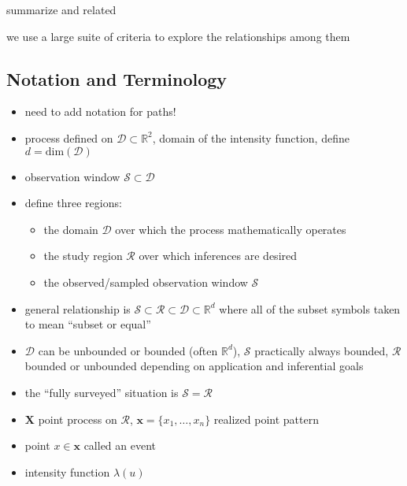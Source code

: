 \documentclass[review]{elsarticle}
\begin{document}
summarize \citet{lark} and related

we use a large suite of criteria to explore the relationships among them


\subsection{Notation and Terminology}

\begin{itemize}

\item need to add notation for paths!

\item process defined on \(\mathcal{D} \subset \mathbb{R}^{2}\), domain of the
intensity function, define \(d = \mathrm{dim}(\mathcal{D})\)

\item observation window \(\mathcal{S} \subset \mathcal{D}\)

\item define three regions:
\begin{itemize}
\item the domain \(\mathcal{D}\) over which the process mathematically operates
\item the study region \(\mathcal{R}\) over which inferences are desired
\item the observed/sampled observation window \(\mathcal{S}\)
\end{itemize}

\item general relationship is \(\mathcal{S} \subset \mathcal{R}
\subset \mathcal{D} \subset \mathbb{R}^{d}\) where all of the subset symbols
taken to mean ``subset or equal''

\item \(\mathcal{D}\) can be unbounded or bounded (often \(\mathbb{R}^{d}\)),
$\mathcal{S}$ practically always bounded, \(\mathcal{R}\) bounded or unbounded
depending on application and inferential goals

\item the ``fully surveyed'' situation is \(\mathcal{S} = \mathcal{R}\)

\item \(\mathbf{X}\) point process on \(\mathcal{R}\), \(\mathbf{x} = \{x_{1},
\dots, x_{n}\}\) realized point pattern

\item point \(x \in \mathbf{x}\) called an event

\item intensity function \(\lambda(u)\)


\end{itemize}
\end{document}
